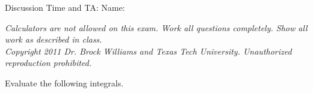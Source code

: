 \documentclass{exam}[12pt]
\begin{document}
\pagestyle{head}

{\large \hspace{1in} }
\large{\hspace{-0.5in} Discussion Time and TA: \hspace{3.5in} Name:}
\vspace{.2in}

\extraheadheight{-.2in}
\extrafootheight{-.2in} 
\small{\textit{Calculators are not allowed on this  exam. 
Work all questions completely.  Show all work as described in class. \\
Copyright 2011 Dr. Brock Williams and
Texas Tech University.  Unauthorized reproduction prohibited.}}

\begin{questions}
\large{

\question Evaluate the following integrals.
}
\end{questions}
\end{document}
